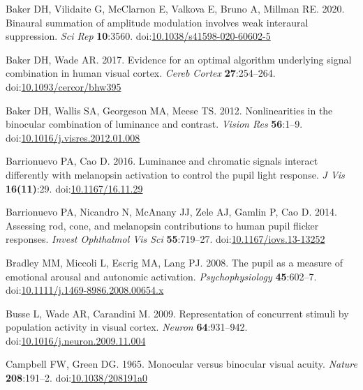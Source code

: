 \documentclass[
]{article}
\begin{document}
\leavevmode\hypertarget{ref-Baker2020}{}%
Baker DH, Vilidaite G, McClarnon E, Valkova E, Bruno A, Millman RE. 2020. Binaural summation of amplitude modulation involves weak interaural suppression. \emph{Sci Rep} \textbf{10}:3560. doi:\href{https://doi.org/10.1038/s41598-020-60602-5}{10.1038/s41598-020-60602-5}

\leavevmode\hypertarget{ref-Baker2017}{}%
Baker DH, Wade AR. 2017. Evidence for an optimal algorithm underlying signal combination in human visual cortex. \emph{Cereb Cortex} \textbf{27}:254--264. doi:\href{https://doi.org/10.1093/cercor/bhw395}{10.1093/cercor/bhw395}

\leavevmode\hypertarget{ref-Baker2012}{}%
Baker DH, Wallis SA, Georgeson MA, Meese TS. 2012. Nonlinearities in the binocular combination of luminance and contrast. \emph{Vision Res} \textbf{56}:1--9. doi:\href{https://doi.org/10.1016/j.visres.2012.01.008}{10.1016/j.visres.2012.01.008}

\leavevmode\hypertarget{ref-Barrionuevo2016}{}%
Barrionuevo PA, Cao D. 2016. Luminance and chromatic signals interact differently with melanopsin activation to control the pupil light response. \emph{J Vis} \textbf{16(11)}:29. doi:\href{https://doi.org/10.1167/16.11.29}{10.1167/16.11.29}

\leavevmode\hypertarget{ref-Barrionuevo2014}{}%
Barrionuevo PA, Nicandro N, McAnany JJ, Zele AJ, Gamlin P, Cao D. 2014. Assessing rod, cone, and melanopsin contributions to human pupil flicker responses. \emph{Invest Ophthalmol Vis Sci} \textbf{55}:719--27. doi:\href{https://doi.org/10.1167/iovs.13-13252}{10.1167/iovs.13-13252}

\leavevmode\hypertarget{ref-Bradley2008}{}%
Bradley MM, Miccoli L, Escrig MA, Lang PJ. 2008. The pupil as a measure of emotional arousal and autonomic activation. \emph{Psychophysiology} \textbf{45}:602--7. doi:\href{https://doi.org/10.1111/j.1469-8986.2008.00654.x}{10.1111/j.1469-8986.2008.00654.x}

\leavevmode\hypertarget{ref-Busse2009}{}%
Busse L, Wade AR, Carandini M. 2009. Representation of concurrent stimuli by population activity in visual cortex. \emph{Neuron} \textbf{64}:931--942. doi:\href{https://doi.org/10.1016/j.neuron.2009.11.004}{10.1016/j.neuron.2009.11.004}

\leavevmode\hypertarget{ref-Campbell1965}{}%
Campbell FW, Green DG. 1965. Monocular versus binocular visual acuity. \emph{Nature} \textbf{208}:191--2. doi:\href{https://doi.org/10.1038/208191a0}{10.1038/208191a0}
\end{document}
